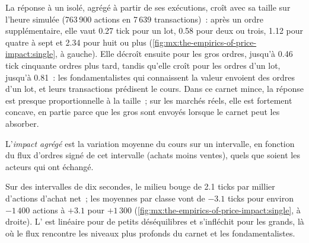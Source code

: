 La réponse à un  isolé, agrégé à partir de ses exécutions, croît avec sa taille sur l'heure simulée (763\,900 actions en 7\,639 transactions)~: après un
ordre supplémentaire, elle vaut 0.27 tick pour un lot, 0.58 pour deux ou trois, 1.12 pour quatre à sept et 2.34 pour huit ou plus (\cref{fig:mx:the-empirics-of-price-impact:single},
à gauche). Elle décroît ensuite pour les gros ordres, jusqu'à 0.46 tick cinquante ordres plus tard, tandis qu'elle croît pour les ordres d'un lot, jusqu'à 0.81~: les fondamentalistes qui connaissent la
valeur envoient des ordres d'un lot, et leurs transactions prédisent le cours. Dans ce carnet mince, la réponse est presque proportionnelle à la taille~; sur les marchés réels, elle est
fortement concave, en partie parce que les gros  sont envoyés lorsque le carnet peut les absorber.

\begin{definition}\label{def:mx:the-empirics-of-price-impact:aggregate}
L'\emph{impact agrégé} est la variation moyenne du cours sur un intervalle, en fonction du flux d'ordres signé de cet intervalle (achats moins
ventes), quels que soient les acteurs qui ont échangé.
\end{definition}

Sur des intervalles de dix secondes, le milieu bouge de 2.1 ticks par millier d'actions d'achat net~; les moyennes par classe vont de $-3.1$ ticks pour environ $-1\,400$ actions à
$+3.1$ pour $+1\,300$ (\cref{fig:mx:the-empirics-of-price-impact:single}, à droite). L' est linéaire pour de petits déséquilibres et s'infléchit pour les grands,
là où le flux rencontre les niveaux plus profonds du carnet et les fondamentalistes.

